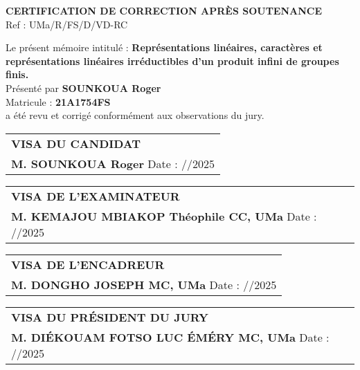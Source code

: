 \documentclass[11pt,a4paper]{article}
\begin{document}
\begin{center}
\vspace{1cm}
\Large\textbf{CERTIFICATION DE CORRECTION APRÈS SOUTENANCE} \\
\vspace{0.5cm}
Ref : \underline{\hspace{3cm}} UMa/R/FS/D/VD-RC \\
\end{center}

\vspace{0.75cm}
\noindent
Le présent mémoire intitulé : \small{\textbf{Représentations linéaires, caractères et représentations linéaires irréductibles d'un produit infini de groupes finis.}} \\
Présenté par \textbf{SOUNKOUA Roger} \\
Matricule : \textbf{21A1754FS} \\
a été revu et corrigé conformément aux observations du jury. \\

\vspace{1.5cm}

\begin{tabular}{@{}l@{}}
\textbf{VISA DU CANDIDAT} \\
\textbf{M. SOUNKOUA Roger}\hspace{5.25cm} Date : \underline{\hspace{1.5cm}}/\underline{\hspace{1.5cm}}/2025\\

\end{tabular}

\vspace{2.5cm}

\begin{tabular}{@{}l@{}}
\textbf{VISA DE L'EXAMINATEUR} \\
\textbf{M. KEMAJOU MBIAKOP Théophile CC, UMa}  \hspace{2.5cm} Date : \underline{\hspace{1.5cm}}/\underline{\hspace{1.5cm}}/2025  \\

\end{tabular}

\vspace{2.5cm}

\begin{tabular}{@{}l@{}}
\textbf{VISA DE L'ENCADREUR} \\
\textbf{M. DONGHO JOSEPH MC, UMa} \hspace{5.3cm} Date : \underline{\hspace{1.5cm}}/\underline{\hspace{1.5cm}}/2025\\

\end{tabular}

\vspace{2.5cm}

\begin{tabular}{@{}l@{}}
\textbf{VISA DU PRÉSIDENT DU JURY} \\
\textbf{M. DIÉKOUAM FOTSO LUC ÉMÉRY MC, UMa} \hspace{2.5cm} Date : \underline{\hspace{1.5cm}}/\underline{\hspace{1.5cm}}/2025\\

\end{tabular}
\end{document}
